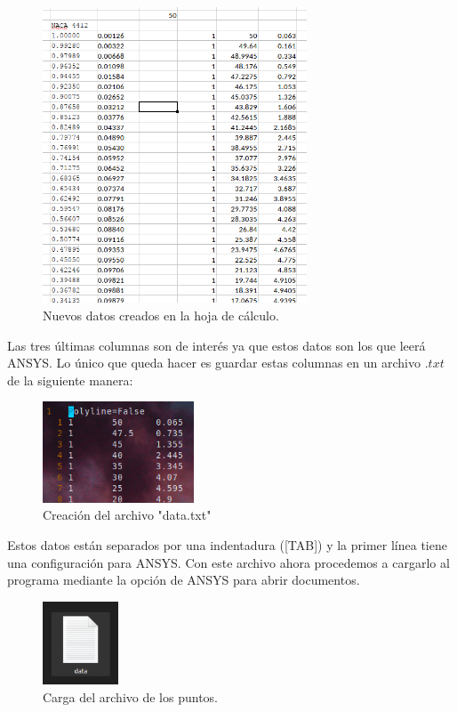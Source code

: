 \documentclass[12pt, letterpaper]{article}
\begin{document}
\begin{figure}[H]
	\centering
	\includegraphics[width=0.7\textwidth]{03.png}
	\caption{Nuevos datos creados en la hoja de cálculo.}
\end{figure}

Las tres últimas columnas son de interés ya que estos datos son los que leerá ANSYS. Lo único que queda hacer es guardar estas columnas en un archivo $.txt$ de la siguiente manera:

\begin{figure}[H]
	\centering
	\includegraphics[width=0.4\textwidth]{04.png}
	\caption{Creación del archivo "data.txt"}
\end{figure}

Estos datos están separados por una indentadura ([TAB]) y la primer línea tiene una configuración para ANSYS. Con este archivo ahora procedemos a cargarlo al programa mediante la opción de ANSYS para abrir documentos.

\begin{figure}[H]
	\centering
	\includegraphics[width=0.2\textwidth]{1.png}
	\caption{Carga del archivo de los puntos.}
\end{figure}
\end{document}
